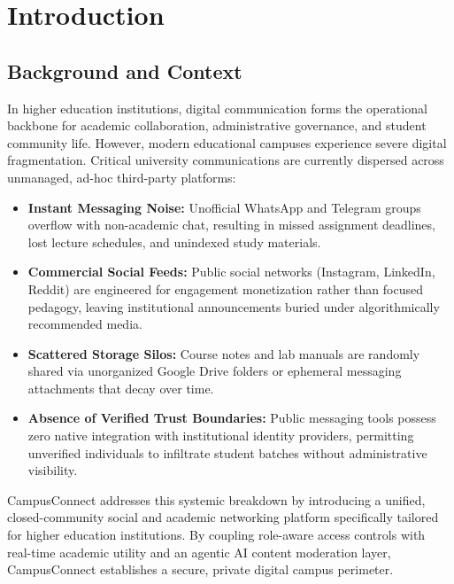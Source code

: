 \documentclass[11pt,a4paper]{report}
\begin{document}
\chapter{Introduction}

\section{Background and Context}

In higher education institutions, digital communication forms the operational backbone for academic collaboration, administrative governance, and student community life. However, modern educational campuses experience severe digital fragmentation. Critical university communications are currently dispersed across unmanaged, ad-hoc third-party platforms:

\begin{itemize}
    \item \textbf{Instant Messaging Noise:} Unofficial WhatsApp and Telegram groups overflow with non-academic chat, resulting in missed assignment deadlines, lost lecture schedules, and unindexed study materials.
    \item \textbf{Commercial Social Feeds:} Public social networks (Instagram, LinkedIn, Reddit) are engineered for engagement monetization rather than focused pedagogy, leaving institutional announcements buried under algorithmically recommended media.
    \item \textbf{Scattered Storage Silos:} Course notes and lab manuals are randomly shared via unorganized Google Drive folders or ephemeral messaging attachments that decay over time.
    \item \textbf{Absence of Verified Trust Boundaries:} Public messaging tools possess zero native integration with institutional identity providers, permitting unverified individuals to infiltrate student batches without administrative visibility.
\end{itemize}

CampusConnect addresses this systemic breakdown by introducing a unified, closed-community social and academic networking platform specifically tailored for higher education institutions. By coupling role-aware access controls with real-time academic utility and an agentic AI content moderation layer, CampusConnect establishes a secure, private digital campus perimeter.
\end{document}
